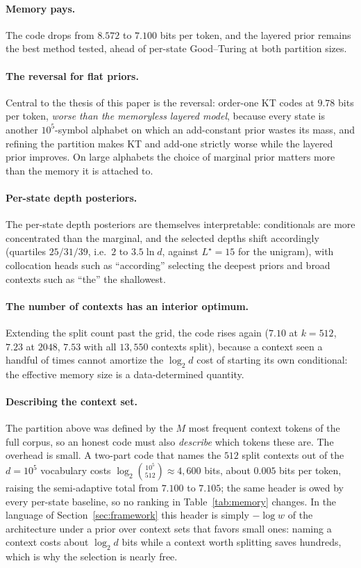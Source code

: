 \documentclass[11pt]{article}
\begin{document}
\paragraph{Memory pays.}
The code drops from \(8.572\) to \(7.100\) bits per token, and the layered
prior remains the best method tested, ahead of per-state Good--Turing at
both partition sizes.

\paragraph{The reversal for flat priors.}
Central to the thesis of this paper is the reversal: order-one KT codes at
\(9.78\) bits per token, \emph{worse than the memoryless layered model},
because every state is another \(10^5\)-symbol alphabet on which an
add-constant prior wastes its mass, and refining the partition makes KT and
add-one strictly worse while the layered prior improves.  On large
alphabets the choice of marginal prior matters more than the memory it is
attached to.

\paragraph{Per-state depth posteriors.}
The per-state depth posteriors are themselves interpretable: conditionals
are more concentrated than the marginal, and the selected depths shift
accordingly (quartiles \(25/31/39\), i.e.\ \(2\) to \(3.5\ln d\), against
\(L^\star{=}15\) for the unigram), with collocation heads such as
``according'' selecting the deepest priors and broad contexts such as
``the'' the shallowest.

\paragraph{The number of contexts has an interior optimum.}
Extending the split count past the grid, the code rises again (\(7.10\) at
\(k=512\), \(7.23\) at \(2048\), \(7.53\) with all \(13{,}550\) contexts
split), because a context seen a handful of times cannot amortize the
\(\log_2 d\) cost of starting its own conditional: the effective memory
size is a data-determined quantity.

\paragraph{Describing the context set.}
The partition above was defined by the \(M\) most frequent context tokens
of the full corpus, so an honest code must also \emph{describe} which
tokens these are.  The overhead is small.  A two-part code that names the
\(512\) split contexts out of the \(d=10^5\) vocabulary costs
\(\log_2\binom{10^5}{512}\approx 4{,}600\) bits, about \(0.005\) bits per
token, raising the semi-adaptive total from \(7.100\) to \(7.105\); the
same header is owed by every per-state baseline, so no ranking in
Table~\ref{tab:memory} changes.  In the language of
Section~\ref{sec:framework} this header is simply \(-\log w\) of the
architecture under a prior over context sets that favors small ones:
naming a context costs about \(\log_2 d\) bits while a context worth
splitting saves hundreds, which is why the selection is nearly free.
\end{document}
